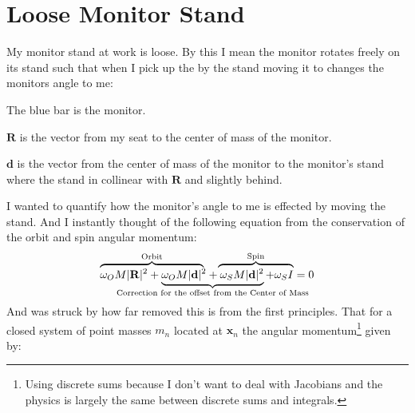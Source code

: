 
\section{Loose Monitor Stand}
My monitor stand at work is loose.
By this I mean the monitor rotates freely on its stand such that when I pick up the by the stand moving it to changes the monitors angle to me:
\begin{center}

The blue bar is the monitor.

$\mathbf{R}$ is the vector from my seat to the center of mass of the monitor.

$\mathbf{d}$ is the vector from the center of mass of the monitor to the monitor's stand where the stand in collinear with $\mathbf{R}$ and slightly behind.
\end{center}
I wanted to quantify how the monitor's angle to me is effected by moving the stand.
And I instantly thought of the following equation from the conservation of the orbit and spin angular momentum: 
\[
\rlap{$\overbrace{\phantom{\omega_OM|R|^2+\omega_OM|d|^2}}^\text{Orbit}$}
\omega_OM|\mathbf{R}|^2+\underbrace{
 \omega_OM|\mathbf{d}|^2+\omega_SM|\mathbf{d}|^2
 }_{\mathclap{\text{Correction for the offset from the Center of Mass}}}+\omega_SI
\llap{$\overbrace{\phantom{\omega_SM|d|^2+\omega_SI}}^\text{Spin}$}
=0
\]
And was struck by how far removed this is from the first principles.
That for a closed system of point masses $m_n$ located at $\mathbf{x}_n$ the angular momentum\footnote{Using discrete sums because I don't want to deal with Jacobians and the physics is largely the same between discrete sums and integrals.} given by:
